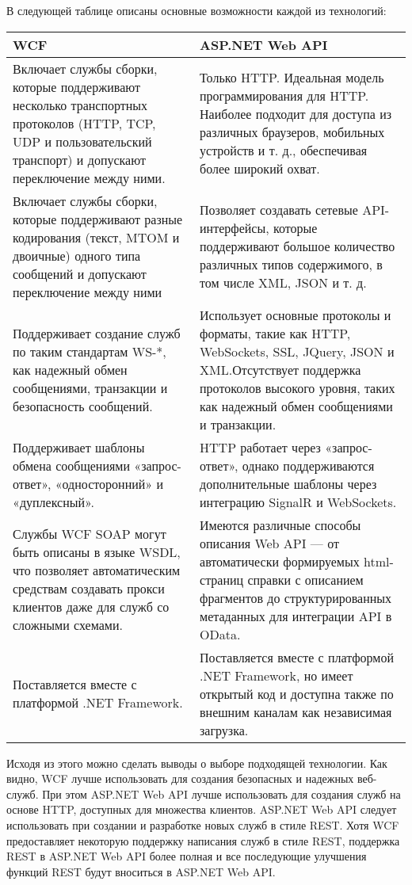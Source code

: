 В следующей таблице описаны основные возможности каждой из технологий:

\begin{center}
\begin{tabular}{| p{200pt} | p{200pt} |}
\hline
\textbf{WCF} & \textbf{ASP.NET Web API} \\ \hline
Включает службы сборки, которые поддерживают несколько транспортных протоколов (HTTP, TCP, UDP и пользовательский транспорт) и допускают переключение между ними. & Только HTTP. Идеальная модель программирования для HTTP. Наиболее подходит для доступа из различных браузеров, мобильных устройств и т. д., обеспечивая более широкий охват. \\ \hline
Включает службы сборки, которые поддерживают разные кодирования (текст, MTOM и двоичные) одного типа сообщений и допускают переключение между ними & Позволяет создавать сетевые API-интерфейсы, которые поддерживают большое количество различных типов содержимого, в том числе XML, JSON и т. д. \\ \hline
Поддерживает создание служб по таким стандартам WS-*, как надежный обмен сообщениями, транзакции и безопасность сообщений. & Использует основные протоколы и форматы, такие как HTTP, WebSockets, SSL, JQuery, JSON и XML.Отсутствует поддержка протоколов высокого уровня, таких как надежный обмен сообщениями и транзакции. \\ \hline
Поддерживает шаблоны обмена сообщениями «запрос-ответ», «односторонний» и «дуплексный». & HTTP работает через «запрос-ответ», однако поддерживаются дополнительные шаблоны через интеграцию SignalR и WebSockets. \\ \hline

Службы WCF SOAP могут быть описаны в языке WSDL, что позволяет автоматическим средствам создавать прокси клиентов даже для служб со сложными схемами. & Имеются различные способы описания Web API — от автоматически формируемых html-страниц справки с описанием фрагментов до структурированных метаданных для интеграции API в OData. \\ \hline
Поставляется вместе с платформой .NET Framework. & Поставляется вместе с платформой .NET Framework, но имеет открытый код и доступна также по внешним каналам как независимая загрузка.\\ \hline


\end{tabular}
\end{center}

Исходя из этого можно сделать выводы о выборе подходящей технологии. Как видно, WCF лучше использовать для создания безопасных и надежных веб-служб. При этом ASP.NET Web API лучше использовать для создания служб на основе HTTP, доступных для множества клиентов. ASP.NET Web API следует использовать при создании и разработке новых служб в стиле REST. Хотя WCF предоставляет некоторую поддержку написания служб в стиле REST, поддержка REST в ASP.NET Web API более полная и все последующие улучшения функций REST будут вноситься в ASP.NET Web API.
\cite{rihter} \cite{heilsberg}
